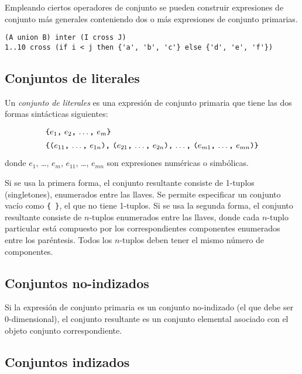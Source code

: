 \documentclass[11pt,spanish]{report}
\def\para#1{\noindent{\bf#1}}
\begin{document}
Empleando ciertos operadores de conjunto se pueden construir expresiones de conjunto más generales conteniendo dos o más expresiones de conjunto primarias.

\newpage

\para{Ejemplos}

\begin{verbatim}
(A union B) inter (I cross J)
1..10 cross (if i < j then {'a', 'b', 'c'} else {'d', 'e', 'f'})
\end{verbatim}

\subsection{Conjuntos de literales}

Un {\it conjunto de literales} es una expresión de conjunto primaria que tiene las dos formas sintácticas siguientes:
$$
{\def\arraystretch{1.4}
\begin{array}{l}
\mbox{{\tt\{}$e_1${\tt,} $e_2${\tt,} \dots{\tt,} $e_m${\tt\}}}\\
\mbox{{\tt\{(}$e_{11}${\tt,} \dots{\tt,} $e_{1n}${\tt),}
{\tt(}$e_{21}${\tt,} \dots{\tt,} $e_{2n}${\tt),} \dots{\tt,}
{\tt(}$e_{m1}${\tt,} \dots{\tt,} $e_{mn}${\tt)\}}}\\
\end{array}
}
$$
donde $e_1$, \dots, $e_m$, $e_{11}$, \dots, $e_{mn}$ son expresiones numéricas o simbólicas.

Si se usa la primera forma, el conjunto resultante consiste de 1-tuplos (singletones), enumerados entre las llaves. Se permite especificar un conjunto vacío como {\tt\{\ \}}, el que no tiene 1-tuplos. Si se usa la segunda forma, el conjunto resultante consiste de $n$-tuplos enumerados entre las llaves, donde cada $n$-tuplo particular está compuesto por los correspondientes componentes enumerados entre los paréntesis. Todos los $n$-tuplos deben tener el mismo número de componentes.

\subsection{Conjuntos no-indizados}

Si la expresión de conjunto primaria es un conjunto no-indizado (el que debe ser 0-dimensional), el conjunto resultante es un conjunto elemental asociado con el objeto conjunto correspondiente.

\subsection{Conjuntos indizados}
\end{document}

